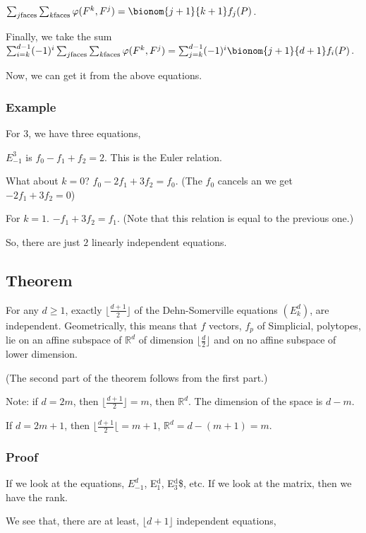 \documentclass[11pt]{article}
\def\R{\mathbb{R}}
\begin{document}
{{{{\(\sum_{j \textup{faces}}\sum_{k \textup{faces}} \varphi(F^k, F^j) =
    \bionom{j + 1}{k + 1} f_j(P)\).

Finally, we take the sum \(\sum_{i = k}^{d -1} (-1)^i \sum_{j \textup{faces}}
    \sum_{k \textup{faces}} \varphi(F^k, F^j) = \sum_{j = k}^{d - 1} (-1)^i
    \bionom{j + 1}{d + 1} f_i(P)\).

Now, we can get it from the above equations.
\subsubsection{Example}
\label{sec:org444b8a8}
For \(3\), we have three equations,

\(E^3_{-1}\) is \(f_0 - f_1 + f_2 = 2\). This is the Euler relation.

What about \(k = 0\)? \(f_0 - 2f_1 + 3f_2 = f_0\). (The \(f_0\) cancels an we get
\(-2f_1 + 3f_2 = 0\))

For \(k = 1\). \(-f_1 + 3f_2 = f_1\). (Note that this relation is equal to the
previous one.)

So, there are just \(2\) linearly independent equations.
\subsection{Theorem}
\label{sec:orgb26f601}
For any \(d \ge 1\), exactly \(\lfloor \frac{d + 1}{2} \rfloor\) of the
Dehn-Somerville equations \((E^d_k)\), are independent. Geometrically, this
means that \(f\) vectors, \(f_p\) of Simplicial, polytopes, lie on an affine
subspace of \(\R^d\) of dimension \(\lfloor \frac{d}{2} \rfloor\) and on no
affine subspace of lower dimension.

(The second part of the theorem follows from the first part.)

Note: if \(d = 2m\), then \(\lfloor \frac{d + 1}{2} \rfloor = m\), then \(\R^d\).
The dimension of the space is \(d - m\).

If \(d = 2m + 1\), then \(\lfloor \frac{d + 1}{2} \lfloor = m + 1\), \(\R^d = d -
   (m + 1) = m\).
\subsubsection{Proof}
\label{sec:org9da0288}
If we look at the equations, \(E_{-1}^d\), E\(_{\text{1}}^{\text{d}}\), E\(_{\text{3}}^{\text{d}}\)\$, etc. If we look
at the matrix, then we have the rank.

We see that, there are at least, \(\lfloor d + 1 \rfloor\) independent
equations, 

}}}}
\end{document}
